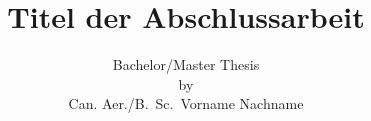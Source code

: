 \documentclass[a4paper,headsepline,bibtotoc]{scrreprt}
\begin{document}
\sloppy


\newcommand{\file}[1]{\mdseries\textsl{\textsf{#1}}}
\newcommand{\sbr}[1]{\texttt{#1}}
\newcommand{\var}[1]{\mdseries\textsl{\texttt{#1}}}
\newcommand{\cmd}[1]{\uppercase{\texttt{#1}}}

\title{Titel der Abschlussarbeit}

\author{Bachelor/Master Thesis \\
        by \\
        Can. Aer./B.\ Sc.\ Vorname Nachname  }

\publishers{conducted at the \\
            Institute of Aerodynamics and Gas Dynamics \\
            University of Stuttgart.
            \\[5ex]
            Stuttgart, January 2023}

\date{}



\maketitle

\newpage
\thispagestyle{empty} 
\section*{}
\newpage

\pagestyle{plain}


\newpage
\thispagestyle{empty} 
\section*{}
\newpage



\newpage
\thispagestyle{empty} 
\section*{}
\newpage



\newpage
\thispagestyle{empty} 
\section*{}
\newpage
\end{document}
